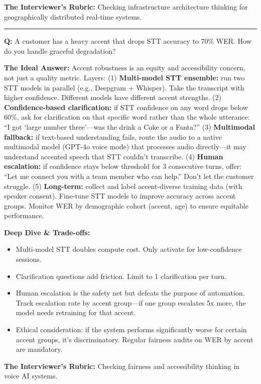 \textbf{The Interviewer's Rubric:} Checking infrastructure architecture thinking for geographically distributed real-time systems.

\bigskip\hrule\bigskip

\textbf{Q:} A customer has a heavy accent that drops STT accuracy to 70\% WER. How do you handle graceful degradation?

\textbf{The Ideal Answer:} Accent robustness is an equity and accessibility concern, not just a quality metric. Layers: (1) \textbf{Multi-model STT ensemble:} run two STT models in parallel (e.g., Deepgram + Whisper). Take the transcript with higher confidence. Different models have different accent strengths. (2) \textbf{Confidence-based clarification:} if STT confidence on any word drops below 60\%, ask for clarification on that specific word rather than the whole utterance: ``I got `large number three'---was the drink a Coke or a Fanta?'' (3) \textbf{Multimodal fallback:} if text-based understanding fails, route the audio to a native multimodal model (GPT-4o voice mode) that processes audio directly---it may understand accented speech that STT couldn't transcribe. (4) \textbf{Human escalation:} if confidence stays below threshold for 3 consecutive turns, offer: ``Let me connect you with a team member who can help.'' Don't let the customer struggle. (5) \textbf{Long-term:} collect and label accent-diverse training data (with speaker consent). Fine-tune STT models to improve accuracy across accent groups. Monitor WER by demographic cohort (accent, age) to ensure equitable performance.

\textbf{Deep Dive \& Trade-offs:}
\begin{itemize}
  \item Multi-model STT doubles compute cost. Only activate for low-confidence sessions.
  \item Clarification questions add friction. Limit to 1 clarification per turn.
  \item Human escalation is the safety net but defeats the purpose of automation. Track escalation rate by accent group---if one group escalates 5x more, the model needs retraining for that accent.
  \item Ethical consideration: if the system performs significantly worse for certain accent groups, it's discriminatory. Regular fairness audits on WER by accent are mandatory.
\end{itemize}

\textbf{The Interviewer's Rubric:} Checking fairness and accessibility thinking in voice AI systems.


